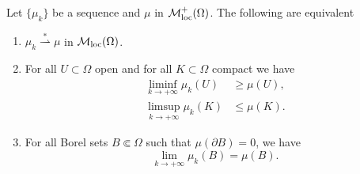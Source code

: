\begin{theorem}
Let $\{\mu_k\}$ be a sequence and $\mu$ in $\mathcal{M}^{+}_{\rm loc}(\Omega)$. The following are equivalent
\begin{enumerate}[(1)]
\item $\mu_k \stackrel {*}{\rightharpoonup} \mu$ in $\mathcal{M}_{\rm loc}(\Omega)$. 
\item For all $U \subset \Omega$ open and for all $K \subset \Omega$ compact we have 
\begin{align} \label{eq:liminf_ineq_open}
\liminf_{k\to + \infty} \mu_{k}(U) & \geq \mu(U), \\
\limsup_{k \to + \infty} \mu_{k}(K) & \leq \mu(K). \label{eq:limsup_ineq_compact}
\end{align} 
\item For all Borel sets $B\Subset \Omega$ such that $\mu(\partial B) = 0$, we
have 
\begin{equation} \label{eq:limit_Borel_no_boundary} 
\lim_{k \to + \infty} \mu_{k}(B) = \mu(B).
\end{equation}
\end{enumerate}
\end{theorem}
